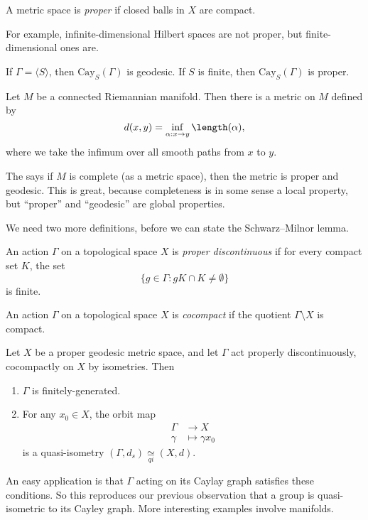 \documentclass[a4paper]{article}
\newcommand\Cay{\mathrm{Cay}}
\newcommand{\qi}{\underset{qi}{\simeq}}
\begin{document}
\begin{defi}
  A metric space is \emph{proper} if closed balls in $X$ are compact.
\end{defi}
For example, infinite-dimensional Hilbert spaces are not proper, but finite-dimensional ones are.

\begin{eg}
  If $\Gamma = \langle S\rangle$, then $\Cay_S(\Gamma)$ is geodesic. If $S$ is finite, then $\Cay_S(\Gamma)$ is proper.
\end{eg}

\begin{eg}
  Let $M$ be a connected Riemannian manifold. Then there is a metric on $M$ defined by
  \[
    d(x, y) = \inf_{\alpha: x \to y} \length(\alpha),
  \]
  where we take the infimum over all smooth paths from $x$ to $y$.

  The  says if $M$ is complete (as a metric space), then the metric is proper and geodesic. This is great, because completeness is in some sense a local property, but ``proper'' and ``geodesic'' are global properties.
\end{eg}

We need two more definitions, before we can state the Schwarz--Milnor lemma.
\begin{defi}
  An action $\Gamma$ on a topological space $X$ is \emph{proper discontinuous} if for every compact set $K$, the set
  \[
    \{g \in \Gamma: gK \cap K \not= \emptyset\}
  \]
  is finite.
\end{defi}

\begin{defi}
  An action $\Gamma$ on a topological space $X$ is \emph{cocompact} if the quotient $\Gamma \setminus X$ is compact.
\end{defi}

\begin{lemma}
  Let $X$ be a proper geodesic metric space, and let $\Gamma$ act properly discontinuously, cocompactly on $X$ by isometries. Then
  \begin{enumerate}
    \item $\Gamma$ is finitely-generated.
    \item For any $x_0 \in X$, the orbit map
      \begin{align*}
        \Gamma &\to X\\
        \gamma &\mapsto \gamma x_0
      \end{align*}
      is a quasi-isometry $(\Gamma, d_s) \qi (X, d)$.
  \end{enumerate}
\end{lemma}
An easy application is that $\Gamma$ acting on its Caylay graph satisfies these conditions. So this reproduces our previous observation that a group is quasi-isometric to its Cayley graph. More interesting examples involve manifolds.
\end{document}
